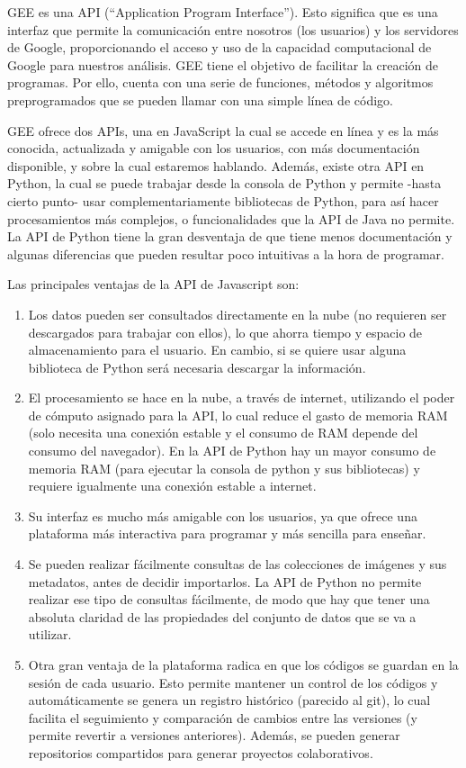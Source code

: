 \documentclass[
  12pt,
  letterpaper,
  twoside]{book}
\providecommand{\tightlist}{%
  \setlength{\itemsep}{0pt}\setlength{\parskip}{0pt}}
\begin{document}
GEE es una API (``Application Program Interface''). Esto significa que es una interfaz que permite la comunicación entre nosotros (los usuarios) y los servidores de Google, proporcionando el acceso y uso de la capacidad computacional de Google para nuestros análisis. GEE tiene el objetivo de facilitar la creación de programas. Por ello, cuenta con una serie de funciones, métodos y algoritmos preprogramados que se pueden llamar con una simple línea de código.

GEE ofrece dos APIs, una en JavaScript la cual se accede en línea y es la más conocida, actualizada y amigable con los usuarios, con más documentación disponible, y sobre la cual estaremos hablando. Además, existe otra API en Python, la cual se puede trabajar desde la consola de Python y permite -hasta cierto punto- usar complementariamente bibliotecas de Python, para así hacer procesamientos más complejos, o funcionalidades que la API de Java no permite. La API de Python tiene la gran desventaja de que tiene menos documentación y algunas diferencias que pueden resultar poco intuitivas a la hora de programar.

Las principales ventajas de la API de Javascript son:

\begin{enumerate}
\def\labelenumi{\arabic{enumi}.}
\tightlist
\item
  Los datos pueden ser consultados directamente en la nube (no requieren ser descargados para trabajar con ellos), lo que ahorra tiempo y espacio de almacenamiento para el usuario. En cambio, si se quiere usar alguna biblioteca de Python será necesaria descargar la información.
\item
  El procesamiento se hace en la nube, a través de internet, utilizando el poder de cómputo asignado para la API, lo cual reduce el gasto de memoria RAM (solo necesita una conexión estable y el consumo de RAM depende del consumo del navegador). En la API de Python hay un mayor consumo de memoria RAM (para ejecutar la consola de python y sus bibliotecas) y requiere igualmente una conexión estable a internet.
\item
  Su interfaz es mucho más amigable con los usuarios, ya que ofrece una plataforma más interactiva para programar y más sencilla para enseñar.
\item
  Se pueden realizar fácilmente consultas de las colecciones de imágenes y sus metadatos, antes de decidir importarlos. La API de Python no permite realizar ese tipo de consultas fácilmente, de modo que hay que tener una absoluta claridad de las propiedades del conjunto de datos que se va a utilizar.
\item
  Otra gran ventaja de la plataforma radica en que los códigos se guardan en la sesión de cada usuario. Esto permite mantener un control de los códigos y automáticamente se genera un registro histórico (parecido al git), lo cual facilita el seguimiento y comparación de cambios entre las versiones (y permite revertir a versiones anteriores). Además, se pueden generar repositorios compartidos para generar proyectos colaborativos.
\end{enumerate}
\end{document}
